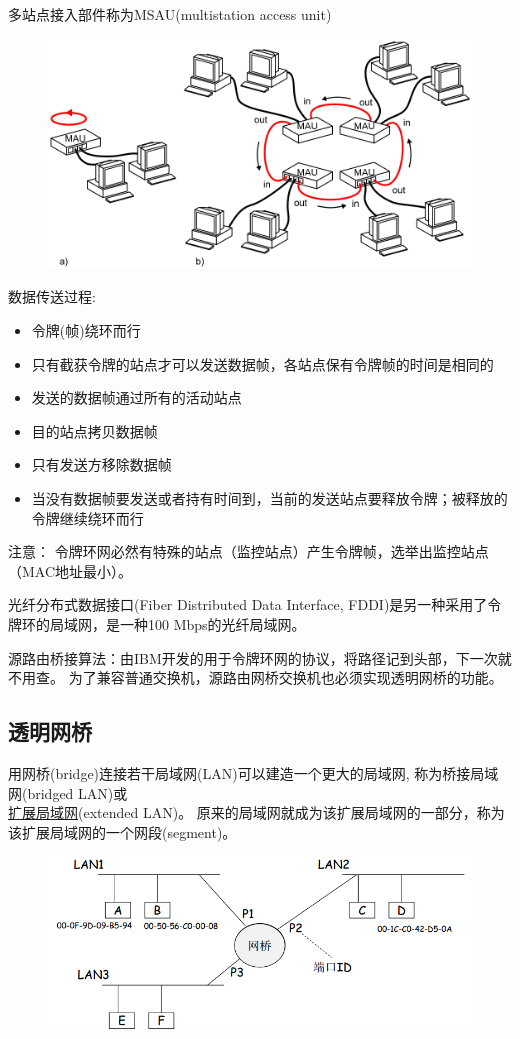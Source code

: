 多站点接入部件称为MSAU(multistation access unit)
\begin{figure}[H]
	\centering
	\includegraphics[width=0.5\linewidth]{fig/token-ring.png}
\end{figure}

数据传送过程:
\begin{itemize}
	\item 令牌(帧)绕环而行
	\item 只有截获令牌的站点才可以发送数据帧，各站点保有令牌帧的时间是相同的
	\item 发送的数据帧通过所有的活动站点
	\item 目的站点拷贝数据帧
	\item 只有发送方移除数据帧
	\item 当没有数据帧要发送或者持有时间到，当前的发送站点要释放令牌；被释放的令牌继续绕环而行
\end{itemize}

注意：
令牌环网必然有特殊的站点（监控站点）产生令牌帧，选举出监控站点（MAC地址最小）。

光纤分布式数据接口(Fiber Distributed Data Interface, FDDI)是另一种采用了令牌环的局域网，是一种100 Mbps的光纤局域网。

源路由桥接算法：由IBM开发的用于令牌环网的协议，将路径记到头部，下一次就不用查。
为了兼容普通交换机，源路由网桥交换机也必须实现透明网桥的功能。

\subsection{透明网桥}
用网桥(bridge)连接若干局域网(LAN)可以建造一个更大的局域网, 称为桥接局域网(bridged LAN)或\\\underline{扩展局域网}(extended LAN)。
原来的局域网就成为该扩展局域网的一部分，称为该扩展局域网的一个网段(segment)。
\begin{figure}[H]
	\centering
	\includegraphics[width=0.6\linewidth]{fig/extended-LAN.png}
\end{figure}

